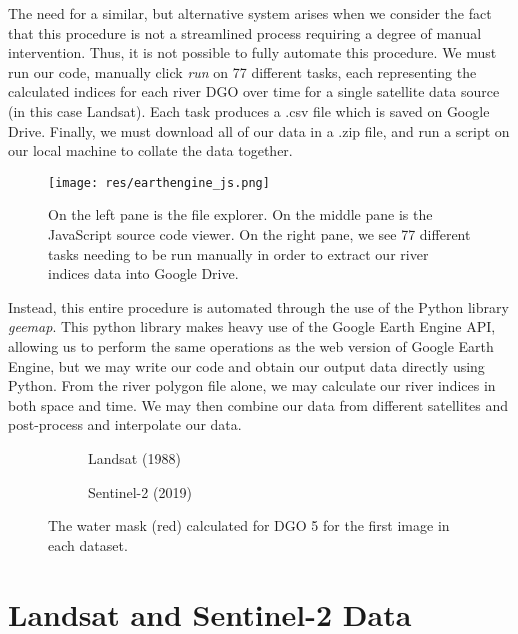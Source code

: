 \documentclass[12pt]{article}
\begin{document}
The need for a similar, but alternative system arises when we consider the fact that this procedure is not a streamlined process requiring a degree of manual intervention. Thus, it is not possible to fully automate this procedure. We must run our code, manually click \emph{run} on 77 different tasks, each representing the calculated indices for each river DGO over time for a single satellite data source (in this case Landsat). Each task produces a .csv file which is saved on Google Drive. Finally, we must download all of our data in a .zip file, and run a script on our local machine to collate the data together.

\begin{figure}[H]
    \centering
    \texttt{[image: res/earthengine\_js.png]}
    \caption{On the left pane is the file explorer. On the middle pane is the JavaScript source code viewer. On the right pane, we see 77 different tasks needing to be run manually in order to extract our river indices data into Google Drive.}
    \label{fig:earth_engine}
\end{figure}

Instead, this entire procedure is automated through the use of the Python library \emph{geemap}\cite{geemap}. This python library makes heavy use of the Google Earth Engine API, allowing us to perform the same operations as the web version of Google Earth Engine, but we may write our code and obtain our output data directly using Python. From the river polygon file alone, we may calculate our river indices in both space and time. We may then combine our data from different satellites and post-process and interpolate our data.

\begin{figure}[H]
    \centering
    \begin{subfigure}[t]{0.45\textwidth}
        \centering
        \caption{Landsat (1988)}
    \end{subfigure}
    \begin{subfigure}[t]{0.45\textwidth}
        \centering
        \caption{Sentinel-2 (2019)}
    \end{subfigure}
    \caption{The water mask (red) calculated for DGO 5 for the first image in each dataset.}
    \label{fig:water_mask}
\end{figure}

\section{Landsat and Sentinel-2 Data}
\end{document}
